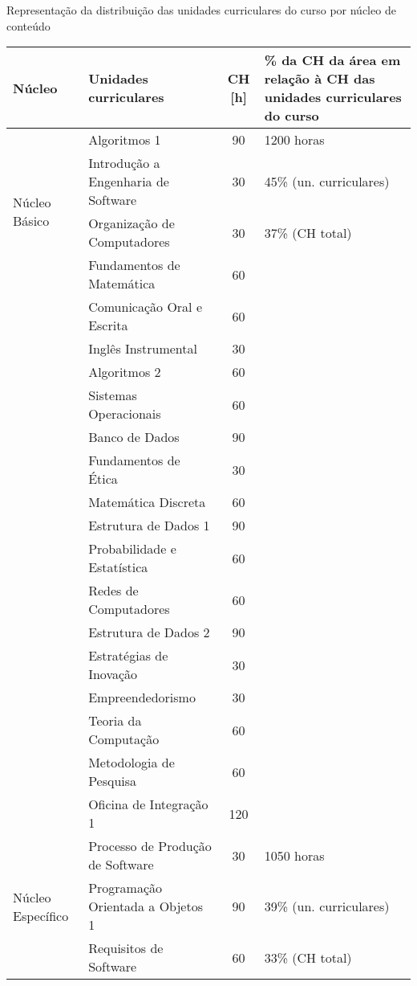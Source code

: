 
\begin{quadro}[ht!]
\caption{Representação da distribuição das unidades curriculares do curso por núcleo de conteúdo}
\label{tab:discarea}
\centering
\scriptsize
\begin{tabular}{|l|l|c|p{3.2cm}|}
\hline
\rowcolor{blue1}
Núcleo  & Unidades curriculares & CH [h]  & \% da CH da área em relação à CH das unidades curriculares do curso\\\hline
\multirow{4}{*}{Núcleo Básico} & Algoritmos 1 & 90 & 1200 horas  \\
\cline-1 & Introdução a Engenharia de Software & 30 & 45\% (un. curriculares)\\
\cline-1 & Organização de Computadores & 30 & 37\% (CH total)\\
\cline{2-3} & Fundamentos de Matemática & 60 & \\
\cline{2-3} & Comunicação Oral e Escrita & 60 & \\
\cline{2-3} & Inglês Instrumental & 30 & \\
\cline{2-3} & Algoritmos 2 & 60 & \\
\cline{2-3} & Sistemas Operacionais & 60 & \\
\cline{2-3} & Banco de Dados & 90 & \\
\cline{2-3} & Fundamentos de Ética & 30 & \\
\cline{2-3} & Matemática Discreta & 60 & \\
\cline{2-3} & Estrutura de Dados 1 & 90 & \\
\cline{2-3} & Probabilidade e Estatística & 60 & \\
\cline{2-3} & Redes de Computadores & 60 & \\
\cline{2-3} & Estrutura de Dados 2 & 90 & \\
\cline{2-3} & Estratégias de Inovação & 30 & \\
\cline{2-3} & Empreendedorismo & 30 & \\
\cline{2-3} & Teoria da Computação & 60 & \\
\cline{2-3} & Metodologia de Pesquisa & 60 & \\
\cline{2-3} & Oficina de Integração 1 & 120 & \\
\hline
\multirow{4}{*}{Núcleo Específico} & Processo de Produção de Software & 30 & 1050 horas  \\
\cline-1 & Programação Orientada a Objetos 1  & 90 & 39\% (un. curriculares)\\
\cline-1 & Requisitos de Software & 60 & 33\% (CH total)\\

\end{tabular}
\end{quadro}
